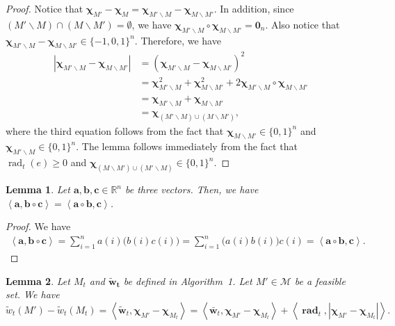 \documentclass{article}
\newtheorem{lemma}{Lemma}
\newcommand{\M}{\mathcal M}
\newcommand{\del}{\backslash}
\newcommand{\RR}{\mathbb R}
\DeclareMathOperator{\rad}{rad}
\newcommand{\inn}[1]{\left\langle #1 \right\rangle}
\renewcommand{\vec}[1]{\boldsymbol{#1}}
\renewcommand{\odot}{\circ}
\begin{document}
\begin{spacing}{1.1}
\begin{proof}
Notice that $\vec\chi_{M'}-\vec\chi_{M} = \vec\chi_{M'\del M}-\vec\chi_{M\del M'}$.
In addition, since $(M'\del M) \cap (M\del M') = \emptyset$, we have
$\vec \chi_{M'\del M} \odot \vec\chi_{M\del M'} = \vec 0_n$. 
Also notice that $ \vec\chi_{M'\del M}-\vec\chi_{M\del M'} \in \{-1,0,1\}^n$.
Therefore, we have
\begin{align*}
|\vec\chi_{M'\del M}-\vec\chi_{M\del M'}| 
&= (\vec\chi_{M'\del M}-\vec\chi_{M\del M'})^2\\
&=\vec\chi_{M'\del M}^2+\vec\chi_{M\del M'}^2+2\vec \chi_{M'\del M} \odot \vec\chi_{M\del M'} \\
&=\vec\chi_{M'\del M}+\vec\chi_{M\del M'}\\
& = \vec\chi_{(M' \del M) \cup (M\del M')},
\end{align*}
where the third equation follows from the fact that $\vec\chi_{M\del M'}\in \{0,1\}^n$ and $\vec\chi_{M'\del M}\in\{0,1\}^n$.
The lemma follows immediately from the fact that $\rad_t(e) \ge 0$ and  $\vec\chi_{(M\del M')\cup(M'\del M)}\in \{0,1\}^n$.
\end{proof}

\begin{lemma}
\label{lemma:vector-technical}
Let $\vec a,\vec b, \vec c \in \RR^n$ be three vectors.
Then, we have $\inn{\vec a, \vec b\odot \vec c} = \inn{\vec a\odot \vec b,\vec c}$.
\end{lemma}

\begin{proof}
We have
\begin{align*}
	\inn{\vec a,\vec b\odot \vec c} = \sum_{i=1}^n a(i) \big(b(i) c(i)\big) = \sum_{i=1}^n \big(a(i)b(i)\big)c(i) = \inn{\vec a\odot\vec b,\vec c}.
\end{align*}
\end{proof}

\begin{lemma}
Let $M_t$ and $\vec{\tilde w_t}$ be defined in Algorithm~1. 
Let $M' \in \M$ be a feasible set.
We have
$$
\tilde w_t(M')-\tilde w_t(M_t) = 
\inn{\vec{\tilde w}_t, \vec \chi_{M'}-\vec \chi_{M_t}} = \inn{\vec {\bar w}_t, \vec \chi_{M'}-\vec\chi_{M_t}}+\inn{\vec \rad_t, |\vec \chi_{M'}-\vec\chi_{M_t}|}.
$$
\label{lemma:tilde}
\end{lemma}


\end{spacing}
\end{document}
